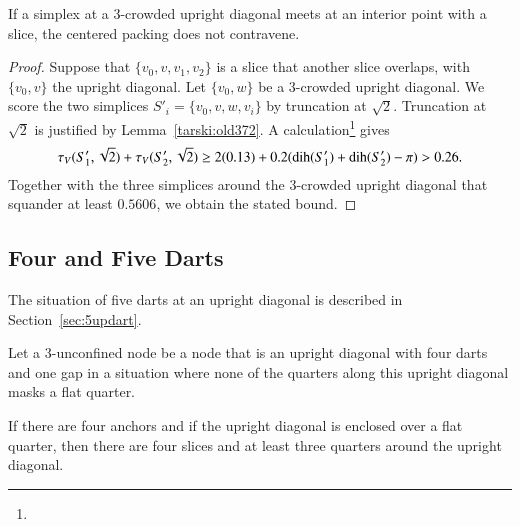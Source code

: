 \begin{lemma}
If a simplex at a $3$-crowded upright diagonal meets at an
interior point with a slice, the centered packing does
not contravene.
\end{lemma}

\begin{proof}
Suppose that $\{v_0,v,v_1,v_2\}$ is a slice that another
slice overlaps, with $\{v_0,v\}$ the upright diagonal.  Let
$\{v_0,w\}$ be a $3$-crowded upright diagonal. We score the two
simplices $S'_i = \{v_0,v,w,v_i\}$ by truncation at $\sqrt{2}$.
Truncation at $\sqrt{2}$ is justified by Lemma~\ref{tarski:old372}.
A calculation\footnote{} %
gives
    $$\tau_V(S'_1,\sqrt{2})+\tau_V(S'_2,\sqrt{2})\ge 2(0.13) +
        0.2(\operatorname{dih}(S'_1)+\operatorname{dih}(S'_2)-\pi) > 0.26.
    $$
Together with the three simplices around the $3$-crowded upright
diagonal that squander at least $0.5606$, we obtain the stated
bound.
\end{proof}



\subsection{Four and Five Darts} %
    \label{sec:five-anchors}



\begin{remark}\label{rem:5dart}
The situation of five darts at an upright diagonal is
described in Section~\ref{sec:5updart}.
\end{remark}

\begin{definition}
Let a $3$-unconfined node be a node that is an upright diagonal 
with four darts and one gap in a situation where none of
the quarters along this upright diagonal masks a flat quarter.
\end{definition}

\begin{lemma}
If there are four anchors and if the upright diagonal is enclosed over a
flat quarter, then there are four slices and at least three
quarters around the upright diagonal.
\end{lemma}

